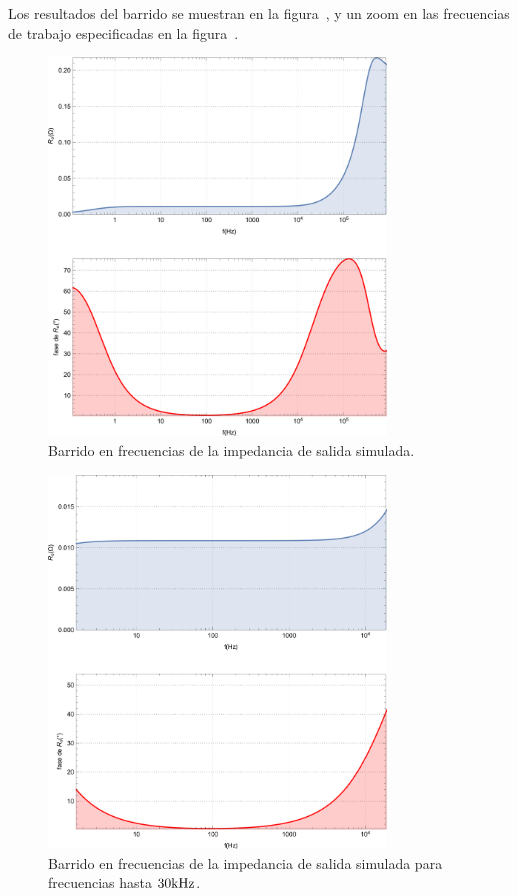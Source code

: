 Los resultados del barrido se muestran en la figura~, y un zoom en las frecuencias de trabajo especificadas en la figura~.

\begin{figure}[H]
	\centering
	\includegraphics[width=0.8\textwidth]{img/sims/R_out.png}
	\caption{Barrido en frecuencias de la impedancia de salida simulada.}
	\label{fig:R_out}
\end{figure}

\begin{figure}[H]
	\centering
	\includegraphics[width=0.8\textwidth]{img/sims/R_out-zoom.png}
	\caption{Barrido en frecuencias de la impedancia de salida simulada para frecuencias hasta $30 \si[per-mode=symbol]{\kilo\hertz}$.}
	\label{fig:R_out-zoom}
\end{figure}

